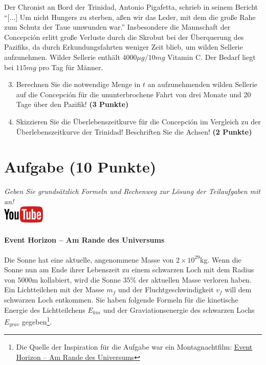 \documentclass[a4paper, 9pt]{scrartcl}\usepackage[]{graphicx}\usepackage[]{xcolor}
\begin{document}
Der Chronist an Bord der Trinidad, Antonio Pigafetta, schrieb in seinem
Bericht "`[...] Um nicht Hungers zu sterben, a{\ss}en wir das Leder, mit dem
die gro{\ss}e Rahe zum Schutz der Taue umwunden war."' Insbesondere die
Mannschaft der Concepci{\'o}n erlitt gro{\ss}e Verluste durch die Skrobut bei der
{\"U}berquerung des Pazifiks, da durch Erkundungsfahrten weniger Zeit blieb, um
wilden Sellerie aufzunehmen. Wilder Sellerie enth{\"a}lt
$4000\mu g/10mg$ Vitamin C. Der Bedarf liegt bei
$115mg$ pro Tag f{\"u}r M{\"a}nner.

\begin{enumerate}
  \setcounter{enumi}{2}
\item Berechnen Sie die notwendige Menge in $t$ an
  aufzunehmenden wilden Sellerie auf die Concepci{\'o}n f{\"u}r die ununterbrochene
  Fahrt von drei Monate und 20 Tage {\"u}ber den Pazifik!
  \textbf{(3 Punkte)}
\item Skizzieren Sie die {\"U}berlebenszeitkurve f{\"u}r die Concepci{\'o}n im
  Vergleich zu der {\"U}berlebenszeitkurve der Trinidad! Beschriften Sie die
  Achsen! \textbf{(2 Punkte)}
\end{enumerate}

 
\clearpage

\section{Aufgabe \hfill (10 Punkte)}

\textit{Geben Sie grunds{\"a}tzlich Formeln und Rechenweg zur L{\"o}sung der
  Teilaufgaben mit an!} \\[1Ex]

\hfill\href{https://youtu.be/q-qYK4Chslg}{\includegraphics[width =
  2cm]{img/youtube}} %
\hspace{2Ex}

\paragraph{Event Horizon -- Am Rande des Universums}



Die Sonne hat eine aktuelle, angenommene Masse von $\ensuremath{2\times 10^{29}}$kg. Wenn
die Sonne nun am Ende ihrer Lebenszeit zu einem schwarzen Loch mit dem
Radius von $5000$m kollabiert, wird die Sonne $35$\%
der aktuellen Masse verloren haben. Ein Lichtteilchen mit der Masse $m_f$
und der Fluchtgeschwindigkeit $v_f$ will dem schwarzen Loch entkommen.  Sie
haben folgende Formeln f{\"u}r die kinetische Energie des Lichtteilchens
$E_{kin}$ und der Graviationsenergie des schwarzen Lochs $E_{grav}$
gegeben\footnote{Die Quelle der Inspiration
  für die Aufgabe war ein Montagnachtfilm:
  \href{https://de.wikipedia.org/wiki/Event_Horizon_–_Am_Rande_des_Universums}{Event Horizon – Am Rande des Universums}}.
\end{document}
